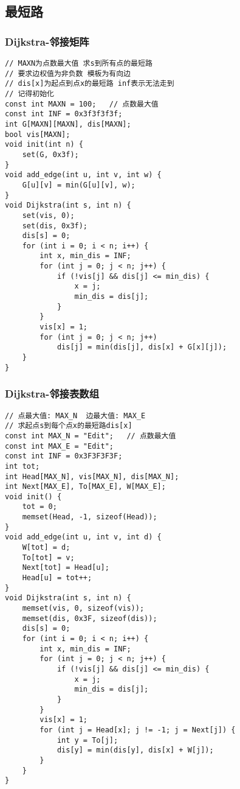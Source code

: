 \documentclass[a4]{article}
\begin{document}
\subsection{最短路}
\subsubsection{Dijkstra-邻接矩阵}
\begin{lstlisting}
// MAXN为点数最大值 求s到所有点的最短路
// 要求边权值为非负数 模板为有向边
// dis[x]为起点到点x的最短路 inf表示无法走到
// 记得初始化
const int MAXN = 100;	// 点数最大值
const int INF = 0x3f3f3f3f;
int G[MAXN][MAXN], dis[MAXN];
bool vis[MAXN];
void init(int n) {
	set(G, 0x3f);
}
void add_edge(int u, int v, int w) {
	G[u][v] = min(G[u][v], w);
}
void Dijkstra(int s, int n) {
	set(vis, 0);
	set(dis, 0x3f);
	dis[s] = 0;
	for (int i = 0; i < n; i++) {
		int x, min_dis = INF;
		for (int j = 0; j < n; j++) {
			if (!vis[j] && dis[j] <= min_dis) {
				x = j;
				min_dis = dis[j];
			}
		}
		vis[x] = 1;
		for (int j = 0; j < n; j++)
			dis[j] = min(dis[j], dis[x] + G[x][j]);
	}
}
\end{lstlisting}
\subsubsection{Dijkstra-邻接表数组}
\begin{lstlisting}
// 点最大值: MAX_N  边最大值: MAX_E
// 求起点s到每个点x的最短路dis[x]
const int MAX_N = "Edit";	// 点数最大值
const int MAX_E = "Edit"; 
const int INF = 0x3F3F3F3F;
int tot;
int Head[MAX_N], vis[MAX_N], dis[MAX_N];
int Next[MAX_E], To[MAX_E], W[MAX_E];
void init() {
	tot = 0;
	memset(Head, -1, sizeof(Head));
}
void add_edge(int u, int v, int d) {
	W[tot] = d;
	To[tot] = v;
	Next[tot] = Head[u];
	Head[u] = tot++;
}
void Dijkstra(int s, int n) {
	memset(vis, 0, sizeof(vis));
	memset(dis, 0x3F, sizeof(dis));
	dis[s] = 0;
	for (int i = 0; i < n; i++) {
		int x, min_dis = INF;
		for (int j = 0; j < n; j++) {
			if (!vis[j] && dis[j] <= min_dis) {
				x = j;
				min_dis = dis[j];
			}
		}
		vis[x] = 1;
		for (int j = Head[x]; j != -1; j = Next[j]) {
			int y = To[j];
			dis[y] = min(dis[y], dis[x] + W[j]);
		}
	}
}
\end{lstlisting}
\end{document}
